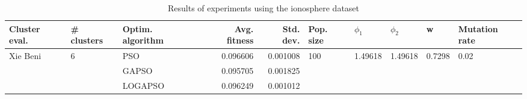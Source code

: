 \begin{table}
\centering
\caption{Results of experiments using the ionosphere dataset}
\begin{tabular}{lllrrlllll}
\toprule
            Cluster eval. &        \# clusters & Optim. algorithm &  Avg. fitness &  Std. dev. &            Pop. size &               $\phi_{1}$ &               $\phi_{2}$ &                       w &         Mutation rate \\
\midrule
\multirow{3}{*}{Xie Beni} & \multirow{3}{*}{6} &              PSO &      0.096606 &   0.001008 & \multirow{3}{*}{100} & \multirow{3}{*}{1.49618} & \multirow{3}{*}{1.49618} & \multirow{3}{*}{0.7298} & \multirow{3}{*}{0.02} \\
                          &                    &            GAPSO &      0.095705 &   0.001825 &                      &                          &                          &                         &                       \\
                          &                    &          LOGAPSO &      0.096249 &   0.001012 &                      &                          &                          &                         &                       \\
\bottomrule
\end{tabular}
\end{table}
